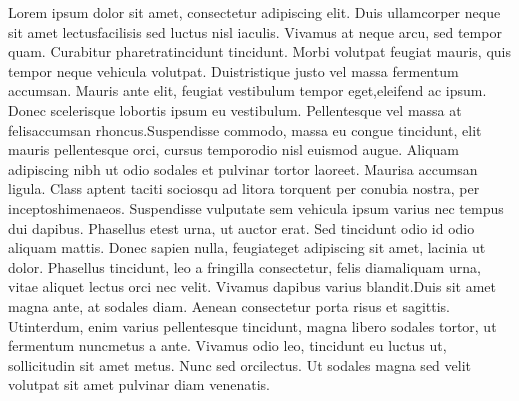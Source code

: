 \documentclass[
	letterpaper,
	itemtextcolor=charcoal,
	titletextcolor=arsenic,
	sidebarwidth=0.28\paperwidth,
	topbottommargin=0.04\paperheight,
	leftrightmargin=18pt,
]{clsFiles/fortysecondscv}
\begin{document}
\vspace*{2.5em}
\makebacksidebar
{}

Lorem ipsum dolor sit amet, consectetur adipiscing elit. Duis ullamcorper neque sit amet lectusfacilisis sed luctus nisl iaculis. Vivamus at neque arcu, sed tempor quam. Curabitur pharetratincidunt tincidunt. Morbi volutpat feugiat mauris, quis tempor neque vehicula volutpat. Duistristique justo vel massa fermentum accumsan. Mauris ante elit, feugiat vestibulum tempor eget,eleifend ac ipsum. Donec scelerisque lobortis ipsum eu vestibulum. Pellentesque vel massa at felisaccumsan rhoncus.Suspendisse commodo, massa eu congue tincidunt, elit mauris pellentesque orci, cursus temporodio nisl euismod augue. Aliquam adipiscing nibh ut odio sodales et pulvinar tortor laoreet. Maurisa accumsan ligula. Class aptent taciti sociosqu ad litora torquent per conubia nostra, per inceptoshimenaeos. Suspendisse vulputate sem vehicula ipsum varius nec tempus dui dapibus. Phasellus etest urna, ut auctor erat. Sed tincidunt odio id odio aliquam mattis. Donec sapien nulla, feugiateget adipiscing sit amet, lacinia ut dolor. Phasellus tincidunt, leo a fringilla consectetur, felis diamaliquam urna, vitae aliquet lectus orci nec velit. Vivamus dapibus varius blandit.Duis sit amet magna ante, at sodales diam. Aenean consectetur porta risus et sagittis. Utinterdum, enim varius pellentesque tincidunt, magna libero sodales tortor, ut fermentum nuncmetus a ante. Vivamus odio leo, tincidunt eu luctus ut, sollicitudin sit amet metus. Nunc sed orcilectus. Ut sodales magna sed velit volutpat sit amet pulvinar diam venenatis.
\end{document}
